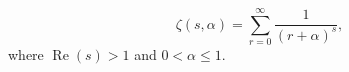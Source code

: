 $$\zeta(s, \alpha) = \sum_{r=0}^{\infty} \frac{1}{(r + \alpha)^s},$$
where $\operatorname{Re}(s) > 1$ and $0 < \alpha \leq 1$.
